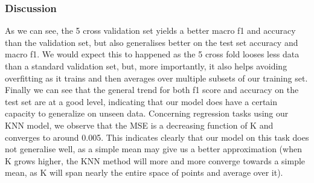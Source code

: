 \subsubsection{Discussion}
As we can see, the 5 cross validation set yields a better macro f1 and accuracy than the validation set, but also generalises better on the test set accuracy and macro f1. We would expect this to happened as the 5 cross fold looses less data than a standard validation set, but, more importantly, it also helps avoiding overfitting as it trains and then averages over multiple subsets of our training set. Finally we can see that the general trend for both f1 score and accuracy on the test set are at a good level, indicating that our model does have a certain capacity to generalize on unseen data.
Concerning regression tasks using our KNN model, we observe that the MSE is a decreasing function of K and converges to around 0.005. This indicates clearly that our model on this task does not generalise well, as a simple mean may give us a better approximation (when K grows higher, the KNN method will more and more converge towards a simple mean, as K will span nearly the entire space of points and average over it).


\newpage

